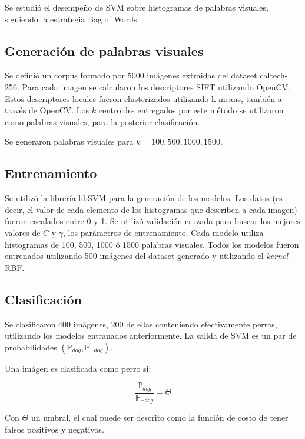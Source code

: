 \documentclass[12pt]{article}
\begin{document}
Se estudió el desempeño de SVM sobre histogramas de palabras visuales, siguiendo la estrategia Bag of Words.

\subsection{Generación de palabras visuales}

Se definió un corpus formado por 5000 imágenes extraidas del dataset
caltech-256\cite{griffin2007caltech}. Para cada imagen se calcularon los
descriptores SIFT utilizando OpenCV.
Estos descriptores locales fueron clusterizados utilizando k-means, también a
través de OpenCV. Los $k$ centroides entregados por este método se utilizaron como
palabras visuales, para la posterior clasificación.

Se generaron palabras visuales para $k = 100, 500, 1000, 1500$.

\subsection{Entrenamiento}

Se utilizó la librería libSVM para la generación de los modelos. Los datos (es
decir, el valor de cada elemento de los histogramas que describen a cada imagen)
fueron escalados entre 0 y 1. Se utilizó validación cruzada para buscar los
mejores valores de $C$ y $\gamma$, los parámetros de entrenamiento. Cada modelo
utiliza histogramas de 100, 500, 1000 ó 1500 palabras visuales. Todos los
modelos fueron entrenados utilizando 500 imágenes del dataset generado y
utilizando el \emph{kernel} RBF.

\subsection{Clasificación}

Se clasificaron 400 imágenes, 200 de ellas conteniendo efectivamente perros,
utilizando los modelos entranados anteriormente. La salida de SVM es un par de
probabilidades $(\mathbb{P}_{dog},\mathbb{P}_{\neg dog})$.

Una imágen es clasificada como perro si:

\begin{equation}
    \frac{ \mathbb{P}_{dog} }{ \mathbb{P}_{\neg dog} } =
    \Theta
\end{equation}

Con $\Theta$ un umbral, el cual puede ser descrito como la función de costo de tener falsos positivos y negativos.
\end{document}
